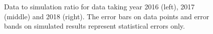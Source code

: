 \begin{figure}[h]
\noindent
{}
	\caption{Data to simulation ratio for data taking year 2016
          (left), 2017 (middle) and 2018 (right). The error bars on data points and error bands on simulated results represent statistical errors only.}
	\label{fig:1dplots_2016_2017_2018}
\end{figure}

